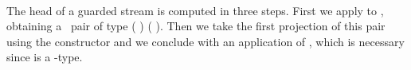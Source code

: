 \begin{code}%
\>[0]\AgdaSpace{}%
\AgdaSymbol{:}\AgdaSpace{}%
\AgdaSpace{}%
\AgdaSpace{}%
\AgdaSpace{}%
\AgdaSpace{}%
\<%
\\
\>[0]\AgdaSpace{}%
\AgdaSpace{}%
\AgdaSymbol{=}\AgdaSpace{}%
\AgdaSpace{}%
\AgdaSymbol{(}\AgdaSpace{}%
\AgdaSymbol{(}\AgdaSpace{}%
\AgdaSymbol{)}\AgdaSpace{}%
\AgdaSpace{}%
\AgdaSpace{}%
\AgdaSymbol{)}\<%
\end{code}
The head of a guarded stream  is computed in three steps. First
we apply  to , obtaining a \GTT\ pair of type  ( )   ( ). Then we take the first projection of this pair using the constructor  and we conclude with an application of , which is necessary since  is a -type.
\begin{code}%
\>[0]\AgdaSpace{}%
\AgdaSymbol{:}\AgdaSpace{}%
\AgdaSymbol{\{}\AgdaSpace{}%
\AgdaSymbol{:}\AgdaSpace{}%
\AgdaSpace{}%
\AgdaSymbol{\}}\AgdaSpace{}%
\AgdaSymbol{\{}\AgdaSpace{}%
\AgdaSymbol{:}\AgdaSpace{}%
\AgdaSpace{}%
\AgdaSymbol{\}}\AgdaSpace{}%
\AgdaSpace{}%
\AgdaSpace{}%
\AgdaSymbol{(}\AgdaSpace{}%
\AgdaSymbol{)}\AgdaSpace{}%
\AgdaSymbol{(}\AgdaSpace{}%
\AgdaSymbol{)}\AgdaSpace{}%
\AgdaSpace{}%
\AgdaSpace{}%
\AgdaSpace{}%
\<%
\\
\>[0]\AgdaSpace{}%
\AgdaSymbol{\{}\AgdaSymbol{\}\{}\AgdaSymbol{\}}\AgdaSpace{}%
\AgdaSpace{}%
\AgdaSymbol{=}\AgdaSpace{}%
\AgdaSpace{}%
\AgdaSymbol{(}\AgdaSpace{}%
\AgdaSymbol{(}\AgdaSpace{}%
\AgdaSymbol{((}\AgdaSpace{}%
\AgdaSymbol{(}\AgdaSpace{}%
\AgdaSymbol{))}\AgdaSpace{}%
\AgdaSpace{}%
\AgdaSymbol{(}\AgdaSpace{}%
\AgdaSymbol{))}\AgdaSpace{}%
\AgdaSymbol{))}\<%
\end{code}

